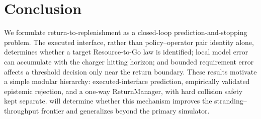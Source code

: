 \section{Conclusion}
\label{sec:conclusion}

We formulate return-to-replenishment as a closed-loop prediction-and-stopping problem. The executed interface, rather than policy--operator pair identity alone, determines whether a target Resource-to-Go law is identified; local model error can accumulate with the charger hitting horizon; and bounded requirement error affects a threshold decision only near the return boundary. These results motivate a simple modular hierarchy: executed-interface prediction, empirically validated epistemic rejection, and a one-way ReturnManager, with hard collision safety kept separate.  will determine whether this mechanism improves the stranding--throughput frontier and generalizes beyond the primary simulator.
